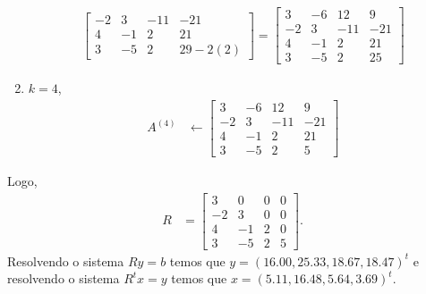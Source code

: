 \begin{questions}
\begin{solution}
\begin{enumerate}
\begin{align*}
\begin{bmatrix}
                        -2 & 3 & -11 & -21 \\
                        4 & -1 & 2 & 21 \\
                        3 & -5 & 2 & 29 - 2(2)
                    \end{bmatrix} = \begin{bmatrix}
                        3 & -6 & 12 & 9 \\
                        -2 & 3 & -11 & -21 \\
                        4 & -1 & 2 & 21 \\
                        3 & -5 & 2 & 25
                    \end{bmatrix}
               \end{align*}
           \item $k = 4$,
               \begin{align*}
                   A^{(4)} &\leftarrow \begin{bmatrix}
                        3 & -6 & 12 & 9 \\
                        -2 & 3 & -11 & -21 \\
                        4 & -1 & 2 & 21 \\
                        3 & -5 & 2 & 5
                    \end{bmatrix}
               \end{align*}
        \end{enumerate}
        Logo,
        \begin{align*}
            R &= \begin{bmatrix}
                3 & 0 & 0 & 0 \\
                -2 & 3 & 0 & 0 \\
                4 & -1 & 2  & 0\\
                3 & -5 & 2 & 5
            \end{bmatrix}.
        \end{align*}
        Resolvendo o sistema $R y = b$ temos que $y = (16.00, 25.33, 18.67, 18.47)^t$ e resolvendo o sistema $R^t x = y$ temos que $x = (5.11, 16.48, 5.64, 3.69)^t$.
     \end{solution}


\end{questions}
